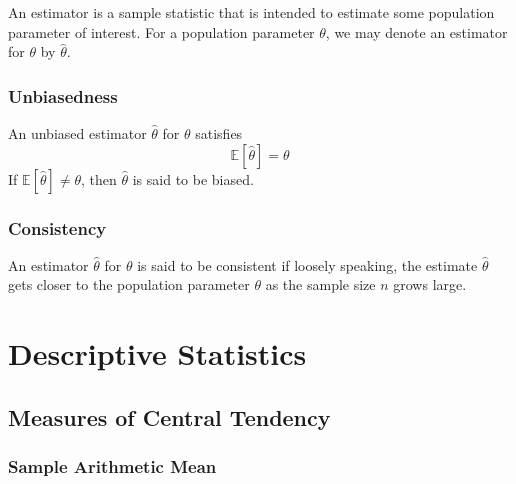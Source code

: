 \documentclass[11pt]{report} %
\begin{document}
An estimator is a sample statistic that is intended to estimate some population parameter of interest. For a population parameter $\theta$, we may denote an estimator for $\theta$ by $\hat{\theta}$.

\subsubsection{Unbiasedness}

An unbiased estimator $\hat{\theta}$ for $\theta$ satisfies
\begin{equation}
\mathbb{E}\left[\hat{\theta}\right] = \theta
\end{equation}
If $\mathbb{E}\left[\hat{\theta}\right] \neq \theta$, then $\hat{\theta}$ is said to be biased.

\subsubsection{Consistency}

An estimator $\hat{\theta}$ for $\theta$ is said to be consistent if loosely speaking, the estimate $\hat{\theta}$ gets closer to the population parameter $\theta$ as the sample size $n$ grows large.

\section{Descriptive Statistics}

\subsection{Measures of Central Tendency}

\subsubsection{Sample Arithmetic Mean}
\end{document}
